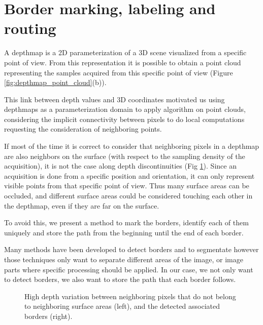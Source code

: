 \documentclass[11pt,fleqn]{book} %
\begin{document}
\section{Border marking, labeling and routing}
\label{sec:border_marking}

A depthmap is a 2D parameterization of a 3D scene visualized from a specific point of view. From this representation it is possible to obtain a point cloud representing the samples acquired from this specific point of view (Figure \ref{fig:depthmap_point_cloud}(b)).

This link between depth values and 3D coordinates motivated us using depthmaps as a parameterization domain to apply algorithm on point clouds, considering the implicit connectivity between pixels to do local computations requesting the consideration of neighboring points.

If most of the time it is correct to consider that neighboring pixels in a depthmap are also neighbors on the surface (with respect to the sampling density of the acquisition), it is not the case along depth discontinuities (Fig \ref{fig:depth_discontinuity}).
Since an acquisition is done from a specific position and orientation, it can only represent visible points from that specific point of view. 
Thus many surface areas can be occluded, and different surface areas could be considered touching each other in the depthmap, even if they are far on the surface.

To avoid this, we present a method to mark the borders, identify each of them uniquely and store the path from the beginning until the end of each border.

Many methods have been developed to detect borders and to segmentate  however those techniques only want to separate different areas of the image, or image parts where specific processing should be applied.
In our case, we not only want to detect borders, we also want to store the path that each border follows.

\begin{figure}
\centering
{}
\caption{High depth variation between neighboring pixels that do not belong to neighboring surface areas (left), and the detected associated borders (right).}
\label{fig:depth_discontinuity}
\end{figure}
\end{document}

